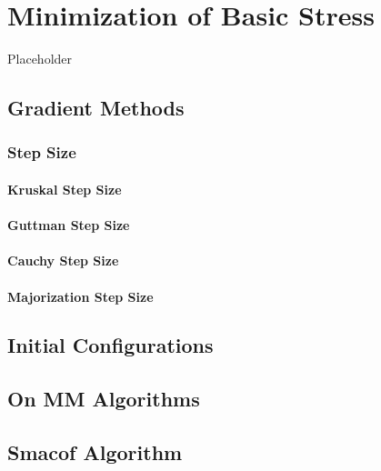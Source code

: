 \documentclass[
  12pt,
]{book}
\begin{document}
\chapter{Minimization of Basic Stress}\label{minstr}

Placeholder

\section{Gradient Methods}\label{gradient-methods}

\subsection{Step Size}\label{step-size}

\subsubsection{Kruskal Step Size}\label{kruskal-step-size}

\subsubsection{Guttman Step Size}\label{guttman-step-size}

\subsubsection{Cauchy Step Size}\label{cauchy-step-size}

\subsubsection{Majorization Step Size}\label{majorization-step-size}

\section{Initial Configurations}\label{initial-configurations}

\section{On MM Algorithms}\label{apmajmin}

\section{Smacof Algorithm}\label{smacof-algorithm}
\end{document}
